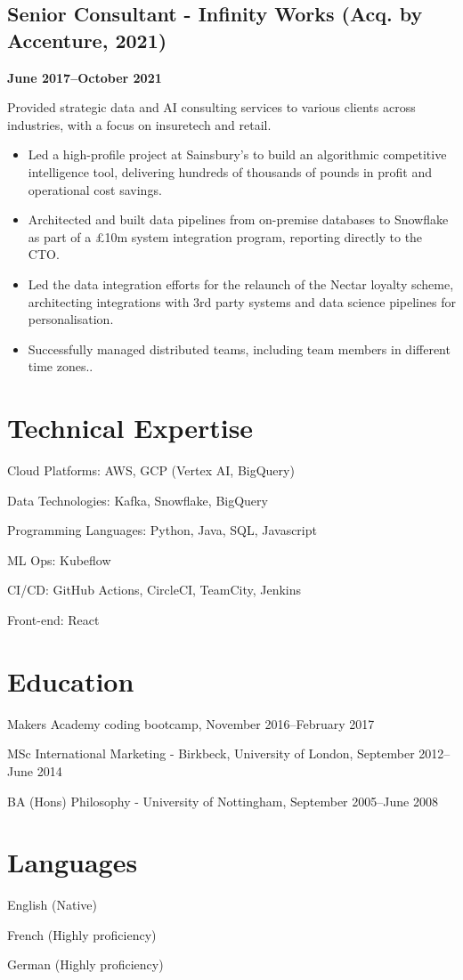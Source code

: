 \documentclass[a4paper]{scrartcl}
\begin{document}
\subsection*{Senior Consultant - Infinity Works (Acq. by Accenture, 2021)}
\textbf{June 2017--October 2021}

Provided strategic data and AI consulting services to various clients across industries, with a focus on insuretech and retail.
\begin{itemize}
	\item Led a high-profile project at Sainsbury's to build an algorithmic competitive intelligence tool, delivering hundreds of thousands of pounds in profit and operational cost savings.
	\item Architected and built data pipelines from on-premise databases to Snowflake as part of a £10m system integration program, reporting directly to the CTO.
	\item Led the data integration efforts for the relaunch of the Nectar loyalty scheme, architecting integrations with 3rd party systems and data science pipelines for personalisation.
	\item Successfully managed distributed teams, including team members in different time zones..
\end{itemize}

\section*{Technical Expertise}
Cloud Platforms: AWS, GCP (Vertex AI, BigQuery)

Data Technologies: Kafka, Snowflake, BigQuery

Programming Languages: Python, Java, SQL, Javascript

ML Ops: Kubeflow

CI/CD: GitHub Actions, CircleCI, TeamCity, Jenkins

Front-end: React

\section*{Education}
Makers Academy coding bootcamp, November 2016--February 2017

MSc International Marketing - Birkbeck, University of London, September 2012--June 2014

BA (Hons) Philosophy - University of Nottingham, September 2005--June 2008

\section*{Languages}
English (Native)

French (Highly proficiency)

German (Highly proficiency)
\end{document}
